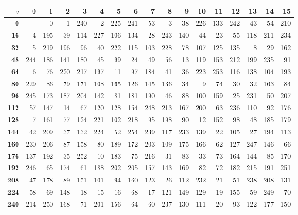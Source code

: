 \begin{center}
\footnotesize
\setlength{\tabcolsep}{3pt}
\renewcommand{\arraystretch}{1.05}
\begin{tabular}{r|rrrrrrrrrrrrrrrr}
\toprule
$v$ & \textbf{0} & \textbf{1} & \textbf{2} & \textbf{3} & \textbf{4} & \textbf{5} & \textbf{6} & \textbf{7} & \textbf{8} & \textbf{9} & \textbf{10} & \textbf{11} & \textbf{12} & \textbf{13} & \textbf{14} & \textbf{15} \\
\midrule
\textbf{  0} & --- & 0 & 1 & 240 & 2 & 225 & 241 & 53 & 3 & 38 & 226 & 133 & 242 & 43 & 54 & 210 \\
\textbf{ 16} & 4 & 195 & 39 & 114 & 227 & 106 & 134 & 28 & 243 & 140 & 44 & 23 & 55 & 118 & 211 & 234 \\
\textbf{ 32} & 5 & 219 & 196 & 96 & 40 & 222 & 115 & 103 & 228 & 78 & 107 & 125 & 135 & 8 & 29 & 162 \\
\textbf{ 48} & 244 & 186 & 141 & 180 & 45 & 99 & 24 & 49 & 56 & 13 & 119 & 153 & 212 & 199 & 235 & 91 \\
\textbf{ 64} & 6 & 76 & 220 & 217 & 197 & 11 & 97 & 184 & 41 & 36 & 223 & 253 & 116 & 138 & 104 & 193 \\
\textbf{ 80} & 229 & 86 & 79 & 171 & 108 & 165 & 126 & 145 & 136 & 34 & 9 & 74 & 30 & 32 & 163 & 84 \\
\textbf{ 96} & 245 & 173 & 187 & 204 & 142 & 81 & 181 & 190 & 46 & 88 & 100 & 159 & 25 & 231 & 50 & 207 \\
\textbf{112} & 57 & 147 & 14 & 67 & 120 & 128 & 154 & 248 & 213 & 167 & 200 & 63 & 236 & 110 & 92 & 176 \\
\textbf{128} & 7 & 161 & 77 & 124 & 221 & 102 & 218 & 95 & 198 & 90 & 12 & 152 & 98 & 48 & 185 & 179 \\
\textbf{144} & 42 & 209 & 37 & 132 & 224 & 52 & 254 & 239 & 117 & 233 & 139 & 22 & 105 & 27 & 194 & 113 \\
\textbf{160} & 230 & 206 & 87 & 158 & 80 & 189 & 172 & 203 & 109 & 175 & 166 & 62 & 127 & 247 & 146 & 66 \\
\textbf{176} & 137 & 192 & 35 & 252 & 10 & 183 & 75 & 216 & 31 & 83 & 33 & 73 & 164 & 144 & 85 & 170 \\
\textbf{192} & 246 & 65 & 174 & 61 & 188 & 202 & 205 & 157 & 143 & 169 & 82 & 72 & 182 & 215 & 191 & 251 \\
\textbf{208} & 47 & 178 & 89 & 151 & 101 & 94 & 160 & 123 & 26 & 112 & 232 & 21 & 51 & 238 & 208 & 131 \\
\textbf{224} & 58 & 69 & 148 & 18 & 15 & 16 & 68 & 17 & 121 & 149 & 129 & 19 & 155 & 59 & 249 & 70 \\
\textbf{240} & 214 & 250 & 168 & 71 & 201 & 156 & 64 & 60 & 237 & 130 & 111 & 20 & 93 & 122 & 177 & 150 \\
\bottomrule
\end{tabular}
\end{center}
